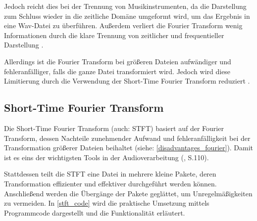 Jedoch reicht dies bei der Trennung von Musikinstrumenten, da die Darstellung zum Schluss wieder in die zeitliche Domäne umgeformt wird, um das Ergebnis in eine Wav-Datei zu überführen. Außerdem verliert die Fourier Transform wenig Informationen durch die klare Trennung von zeitlicher und frequentieller Darstellung \parencite{Parsons_2000}.

\par

Allerdings ist die Fourier Transform bei größeren Dateien aufwändiger und fehleranfälliger, falls die ganze Datei transformiert wird. Jedoch wird diese Limitierung durch die Verwendung der Short-Time Fourier Transform reduziert \parencite{Prashanth_2017}.

%
\subsection{Short-Time Fourier Transform}
%

Die Short-Time Fourier Transform (auch: STFT) basiert auf der Fourier Transform, dessen Nachteile zunehmender Aufwand und fehleranfälligkeit bei der Transformation größerer Dateien beihaltet (siehe: \cref{disadvantages_fourier}). Damit ist es eins der wichtigsten Tools in der Audioverarbeitung (\cite{fundamentals_of_music_processing}, S.110).

\par

Stattdessen teilt die STFT eine Datei in mehrere kleine Pakete, deren Transformation effizienter und effektiver durchgeführt werden können. Anschließend werden die Übergänge der Pakete geglättet, um Unregelmäßigkeiten zu vermeiden. In \cref{stft_code} wird die praktische Umsetzung mittels Programmcode dargestellt und die Funktionalität erläutert.